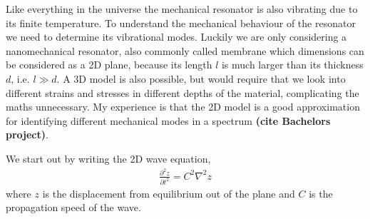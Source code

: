 Like everything in the universe the mechanical resonator is also vibrating due to its finite temperature. To understand the mechanical behaviour of the resonator we need to determine its vibrational modes. Luckily we are only considering a nanomechanical resonator, also commonly called membrane which dimensions can be considered as a 2D plane, because its length $l$ is much larger than its thickness $d$, i.e.  $l \gg d$. A 3D model is also possible, but would require that we look into different strains and stresses in different depths of the material, complicating the maths unnecessary. My experience is that the 2D model is a good approximation for identifying different mechanical modes in a spectrum \textbf{(cite Bachelors project)}.

We start out by writing the 2D wave equation,
\begin{align}
\frac{\partial^2 z }{\partial t^2} = C^2\nabla^2 z
\end{align}
where $z$ is the displacement from equilibrium out of the plane and $C$ is the propagation speed of the wave.